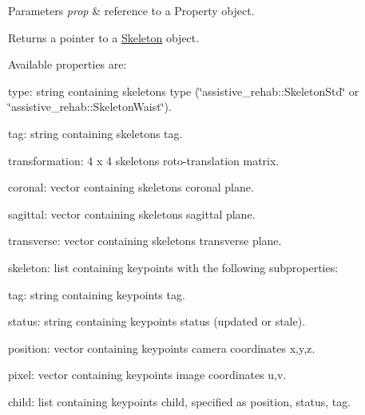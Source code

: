 \begin{DoxyParams}{Parameters}
{\em prop} & reference to a Property object. \\
\hline
\end{DoxyParams}
\begin{DoxyReturn}{Returns}
a pointer to a \mbox{\hyperlink{classassistive__rehab_1_1Skeleton}{Skeleton}} object.
\end{DoxyReturn}
Available properties are\+:
\begin{DoxyItemize}
\item type\+: string containing skeleton\textquotesingle{}s type (\char`\"{}assistive\+\_\+rehab\+::\+Skeleton\+Std\char`\"{} or \char`\"{}assistive\+\_\+rehab\+::\+Skeleton\+Waist\char`\"{}).
\item tag\+: string containing skeleton\textquotesingle{}s tag.
\item transformation\+: 4 x 4 skeleton\textquotesingle{}s roto-\/translation matrix.
\item coronal\+: vector containing skeleton\textquotesingle{}s coronal plane.
\item sagittal\+: vector containing skeleton\textquotesingle{}s sagittal plane.
\item transverse\+: vector containing skeleton\textquotesingle{}s transverse plane.
\item skeleton\+: list containing keypoints with the following subproperties\+:
\begin{DoxyItemize}
\item tag\+: string containing keypoint\textquotesingle{}s tag.
\item status\+: string containing keypoint\textquotesingle{}s status (updated or stale).
\item position\+: vector containing keypoint\textquotesingle{}s camera coordinates x,y,z.
\item pixel\+: vector containing keypoint\textquotesingle{}s image coordinates u,v.
\item child\+: list containing keypoint\textquotesingle{}s child, specified as position, status, tag. 
\end{DoxyItemize}
\end{DoxyItemize}
